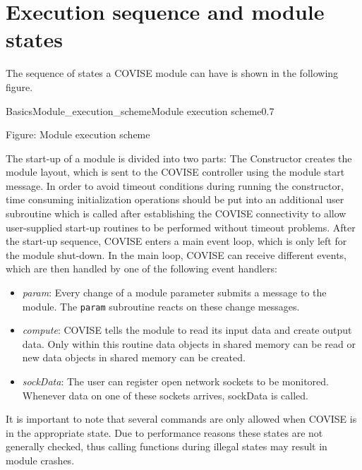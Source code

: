 \section{Execution sequence and module states}
\latexonly
{} 
\endlatexonly

The sequence of states a COVISE module can have is shown in the following figure.

\begin{covimg}{Basics}{Module_execution_scheme}{Module execution scheme}{0.7}\
\end{covimg}
\begin{htmlonly}
Figure: Module execution scheme
\vspace*{1cm}
\end{htmlonly}

The start-up of a module  is divided into two parts: The Constructor creates the module 
layout, which is sent to the COVISE controller using the module start message.
In order to avoid timeout conditions during running the constructor,
time consuming initialization operations should be put into an additional user subroutine
which is called after establishing the COVISE connectivity to allow user-supplied start-up routines to 
be performed without timeout problems. After the start-up sequence, COVISE enters a 
main event loop, which is only left for the module shut-down. In the main loop, COVISE 
can receive different events, which are then handled by one of the following event 
handlers:

\begin{itemize}

\item {\it param}: Every change of a module parameter submits a message 
to the module. The \texttt{param} subroutine reacts on these change messages.

\item {\it compute}: COVISE tells the module to read its input data and create output data. 
Only within this routine data objects in shared memory can be read or new data objects 
in shared memory can be created.

\item {\it sockData}: The user can register open network sockets to be monitored. Whenever 
data on one of these sockets arrives, sockData is called.

\end{itemize}

It is important to note that several commands are only allowed when COVISE is in the 
appropriate state. Due to performance reasons these states are not generally checked, 
thus calling functions during illegal states may result in module crashes.

